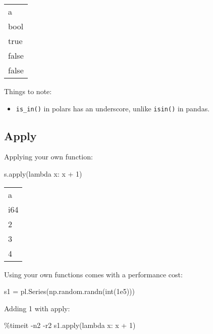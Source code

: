 \documentclass[
  letterpaper,
  DIV=11,
  numbers=noendperiod]{scrartcl}
\newenvironment{Shaded}{\begin{snugshade}}{\end{snugshade}}
\newcommand{\BuiltInTok}[1]{\textcolor[rgb]{0.00,0.23,0.31}{#1}}
\newcommand{\DecValTok}[1]{\textcolor[rgb]{0.68,0.00,0.00}{#1}}
\newcommand{\FloatTok}[1]{\textcolor[rgb]{0.68,0.00,0.00}{#1}}
\newcommand{\KeywordTok}[1]{\textcolor[rgb]{0.00,0.23,0.31}{#1}}
\newcommand{\NormalTok}[1]{\textcolor[rgb]{0.00,0.23,0.31}{#1}}
\newcommand{\OperatorTok}[1]{\textcolor[rgb]{0.37,0.37,0.37}{#1}}
\providecommand{\tightlist}{%
  \setlength{\itemsep}{0pt}\setlength{\parskip}{0pt}}\usepackage{longtable,booktabs,array}
\begin{document}
\begin{longtable}[]{@{}l@{}}
\toprule()
a \\
bool \\
\midrule()
\endhead
true \\
false \\
false \\
\bottomrule()
\end{longtable}

Things to note:

\begin{itemize}
\tightlist
\item
  \texttt{is\_in()} in polars has an underscore, unlike \texttt{isin()}
  in pandas.
\end{itemize}

\hypertarget{apply}{%
\subsection{Apply}\label{apply}}

Applying your own function:

\begin{Shaded}
\begin{Highlighting}[]
\NormalTok{s.}\BuiltInTok{apply}\NormalTok{(}\KeywordTok{lambda}\NormalTok{ x: x }\OperatorTok{+} \DecValTok{1}\NormalTok{)}
\end{Highlighting}
\end{Shaded}

\begin{longtable}[]{@{}l@{}}
\toprule()
a \\
i64 \\
\midrule()
\endhead
2 \\
3 \\
4 \\
\bottomrule()
\end{longtable}

Using your own functions comes with a performance cost:

\begin{Shaded}
\begin{Highlighting}[]
\NormalTok{s1 }\OperatorTok{=}\NormalTok{ pl.Series(np.random.randn(}\BuiltInTok{int}\NormalTok{(}\FloatTok{1e5}\NormalTok{)))}
\end{Highlighting}
\end{Shaded}

Adding 1 with apply:

\begin{Shaded}
\begin{Highlighting}[]
\OperatorTok{\%}\NormalTok{timeit }\OperatorTok{{-}}\NormalTok{n2 }\OperatorTok{{-}}\NormalTok{r2 s1.}\BuiltInTok{apply}\NormalTok{(}\KeywordTok{lambda}\NormalTok{ x: x }\OperatorTok{+} \DecValTok{1}\NormalTok{)}
\end{Highlighting}
\end{Shaded}
\end{document}

